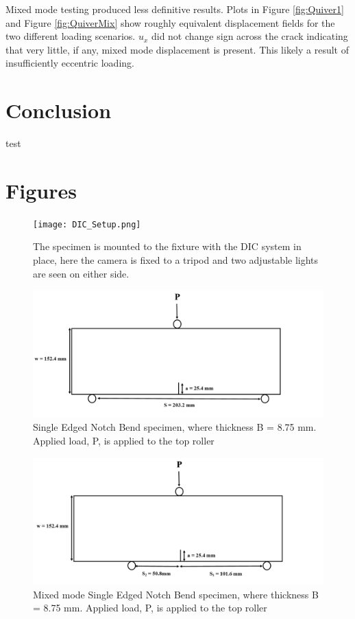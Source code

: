\documentclass[12pt]{article}
\begin{document}
Mixed mode testing produced less definitive results. Plots in  Figure \ref{fig:Quiver1} and Figure \ref{fig:QuiverMix} show roughly equivalent displacement fields for the two different loading scenarios. $u_x$ did not change sign across the crack indicating that very little, if any, mixed mode displacement is present. This likely a result of insufficiently eccentric loading. 
\section{Conclusion}%
test
\section{Figures}
\begin{figure}[H]
	\centering
	\texttt{[image: DIC\_Setup.png]}
	\caption{The specimen is mounted to the fixture with the DIC system in place, here the camera is fixed to a tripod and two adjustable lights are seen on either side.}
	\label{fig:DIC}
\end{figure}

\begin{figure}[H]
	\centering
	\includegraphics[width=1\textwidth]{Geometry.png}
	\caption{Single Edged Notch Bend specimen, where thickness B = 8.75 mm. Applied load, P, is applied to the top roller}
	\label{fig:Geometry}
\end{figure}

\begin{figure}[H]
	\centering
	\includegraphics[width=1\textwidth]{Geometry_Mixed.png}
	\caption{Mixed mode Single Edged Notch Bend specimen, where thickness B = 8.75 mm. Applied load, P, is applied to the top roller}
	\label{fig:Geometry_Mixed}
\end{figure}
\end{document}
